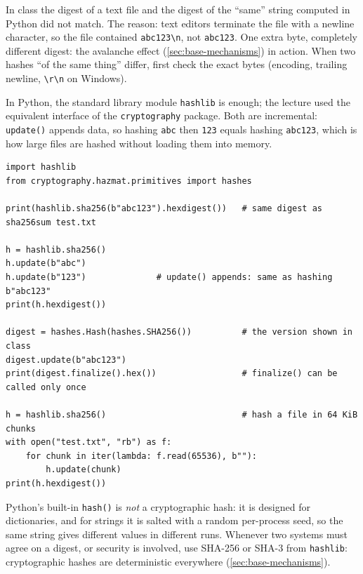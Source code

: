 \begin{remark}
In class the digest of a text file and the digest of the \enquote{same} string computed in Python did not match. The reason: text editors terminate the file with a newline character, so the file contained \texttt{abc123\textbackslash n}, not \texttt{abc123}. One extra byte, completely different digest: the avalanche effect (\cref{sec:base-mechanisms}) in action. When two hashes \enquote{of the same thing} differ, first check the exact bytes (encoding, trailing newline, \texttt{\textbackslash r\textbackslash n} on Windows).
\end{remark}

In Python, the standard library module \texttt{hashlib} is enough; the lecture used the equivalent interface of the \texttt{cryptography} package. Both are incremental: \texttt{update()} appends data, so hashing \texttt{abc} then \texttt{123} equals hashing \texttt{abc123}, which is how large files are hashed without loading them into memory.

\begin{verbatim}
import hashlib
from cryptography.hazmat.primitives import hashes

print(hashlib.sha256(b"abc123").hexdigest())   # same digest as sha256sum test.txt

h = hashlib.sha256()
h.update(b"abc")
h.update(b"123")              # update() appends: same as hashing b"abc123"
print(h.hexdigest())

digest = hashes.Hash(hashes.SHA256())          # the version shown in class
digest.update(b"abc123")
print(digest.finalize().hex())                 # finalize() can be called only once

h = hashlib.sha256()                           # hash a file in 64 KiB chunks
with open("test.txt", "rb") as f:
    for chunk in iter(lambda: f.read(65536), b""):
        h.update(chunk)
print(h.hexdigest())
\end{verbatim}

\begin{remark}
Python's built-in \texttt{hash()} is \emph{not} a cryptographic hash: it is designed for dictionaries, and for strings it is salted with a random per-process seed, so the same string gives different values in different runs. Whenever two systems must agree on a digest, or security is involved, use SHA-256 or SHA-3 from \texttt{hashlib}: cryptographic hashes are deterministic everywhere (\cref{sec:base-mechanisms}).
\end{remark}

